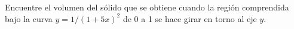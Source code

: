 \item Encuentre el volumen del sólido que se obtiene cuando la región comprendida bajo la curva $y = 1/(1 + 5x)^2$ de 0 a 1 se hace girar en torno al eje $y$.
